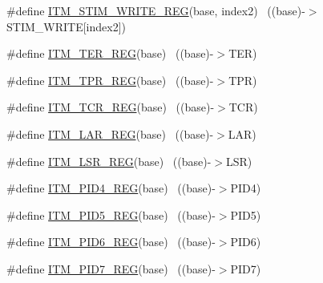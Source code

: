 \begin{DoxyCompactItemize}
\#define \hyperlink{group___i_t_m___register___accessor___macros_ga049ca92a4e78e77c19af81e51aa73f1c}{I\+T\+M\+\_\+\+S\+T\+I\+M\+\_\+\+W\+R\+I\+T\+E\+\_\+\+R\+EG}(base,  index2)                ~((base)-\/$>$S\+T\+I\+M\+\_\+\+W\+R\+I\+TE\mbox{[}index2\mbox{]})
\item 
\#define \hyperlink{group___i_t_m___register___accessor___macros_ga0952675d3a89701dd186427f1c52c919}{I\+T\+M\+\_\+\+T\+E\+R\+\_\+\+R\+EG}(base)                                            ~((base)-\/$>$T\+ER)
\item 
\#define \hyperlink{group___i_t_m___register___accessor___macros_gaae645266e2d2ce5b4085486432dee954}{I\+T\+M\+\_\+\+T\+P\+R\+\_\+\+R\+EG}(base)                                            ~((base)-\/$>$T\+PR)
\item 
\#define \hyperlink{group___i_t_m___register___accessor___macros_gaded31ba9ed7d78748d2ec3fb8746caff}{I\+T\+M\+\_\+\+T\+C\+R\+\_\+\+R\+EG}(base)                                            ~((base)-\/$>$T\+CR)
\item 
\#define \hyperlink{group___i_t_m___register___accessor___macros_ga20b6604c5d16c42c91578bb58acc8249}{I\+T\+M\+\_\+\+L\+A\+R\+\_\+\+R\+EG}(base)                                            ~((base)-\/$>$L\+AR)
\item 
\#define \hyperlink{group___i_t_m___register___accessor___macros_gabbc1e9dd748b0d19926b2c64c868606d}{I\+T\+M\+\_\+\+L\+S\+R\+\_\+\+R\+EG}(base)                                            ~((base)-\/$>$L\+SR)
\item 
\#define \hyperlink{group___i_t_m___register___accessor___macros_ga0d86c795356f8b5785a8d32963143e18}{I\+T\+M\+\_\+\+P\+I\+D4\+\_\+\+R\+EG}(base)                                          ~((base)-\/$>$P\+I\+D4)
\item 
\#define \hyperlink{group___i_t_m___register___accessor___macros_ga4740a0d11d383ca9f9406176f83f736e}{I\+T\+M\+\_\+\+P\+I\+D5\+\_\+\+R\+EG}(base)                                          ~((base)-\/$>$P\+I\+D5)
\item 
\#define \hyperlink{group___i_t_m___register___accessor___macros_gabc5f851ab862e91124ef9a5d54ed0c23}{I\+T\+M\+\_\+\+P\+I\+D6\+\_\+\+R\+EG}(base)                                          ~((base)-\/$>$P\+I\+D6)
\item 
\#define \hyperlink{group___i_t_m___register___accessor___macros_ga4d55d1ec8c7452f081f103a4e4ded062}{I\+T\+M\+\_\+\+P\+I\+D7\+\_\+\+R\+EG}(base)                                          ~((base)-\/$>$P\+I\+D7)
\item 

\end{DoxyCompactItemize}
